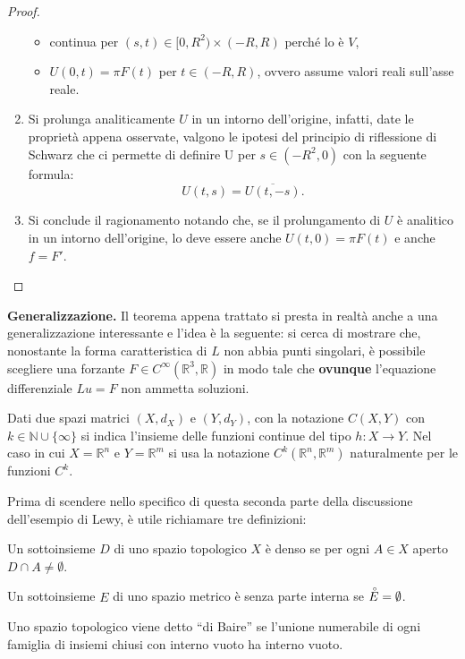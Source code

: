 \begin{proof}
\begin{enumerate}[1.]
\begin{itemize}
\item
continua per $(s,t) \in [0,R^2) \times (-R,R)$ perché lo è $V$,
\item
$U(0,t)=\pi F(t)$ per $t\in (-R,R)$, ovvero assume valori reali sull'asse reale.
\end{itemize}
\item
Si prolunga analiticamente $U$ in un intorno dell'origine, infatti, 
date le proprietà appena osservate, valgono le ipotesi del principio di riflessione di Schwarz che ci permette 
di definire U per $s\in (-R^2,0)$ con la seguente formula: $$U(t,s)=\overline{U(t,-s)}.$$
\item
Si conclude il ragionamento notando che, se il prolungamento di $U$ è analitico in un intorno dell'origine, lo deve essere anche $U(t,0)=\pi F(t)$ e anche $f=F'$.
\end{enumerate}
\end{proof}

\textbf{Generalizzazione.} Il teorema appena trattato si presta in realtà anche a una generalizzazione interessante e l'idea è la seguente: si cerca di mostrare che, nonostante la forma caratteristica di $L$ non abbia punti singolari, è possibile scegliere una forzante $F \in C^{\infty} (\mathbb{R}^3, \mathbb{R})$ in modo tale che \textbf{ovunque} l'equazione differenziale $Lu=F$ non ammetta soluzioni.

\begin{remark}
Dati due spazi matrici $(X,d_X)$ e $(Y,d_Y)$, con la notazione $C(X,Y)$ con $k \in \mathbb{N} \cup \{\infty\}$ si indica l'insieme delle funzioni continue del tipo $h:X \rightarrow Y$. Nel caso in cui $X=\mathbb{R}^n$ e $Y=\mathbb{R}^m$ si usa la notazione $C^k(\mathbb{R}^n,\mathbb{R}^m)$ naturalmente per le funzioni $C^k$.
\end{remark}

Prima di scendere nello specifico di questa seconda parte della discussione dell'esempio di Lewy, è utile richiamare tre definizioni:
\begin{definition}
Un sottoinsieme $D$ di uno spazio topologico $X$ è denso se per ogni $ A \in X$ aperto $D \cap A \neq \emptyset $.
\end{definition}
\begin{definition}
Un sottoinsieme $E$ di uno spazio metrico è senza parte interna se $\accentset{\circ}{E}=\emptyset$.
\end{definition}
\begin{definition}
Uno spazio topologico viene detto ``di Baire'' se l'unione numerabile di ogni famiglia di insiemi chiusi con interno vuoto ha interno vuoto.
\end{definition}

